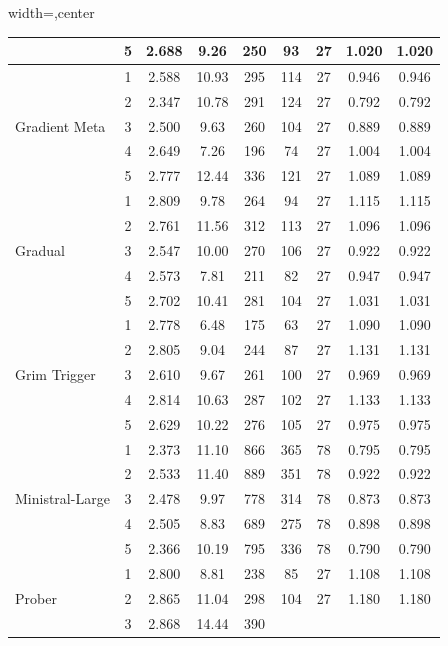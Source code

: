 \begin{table}[htbp]
\begin{adjustbox}{width=\textwidth,center}
\begin{tabular}{|l|c|c|c|c|c|c|c|c|}
 & 
5 & 
2.688 & 
9.26 & 
250 & 
93 & 
27 & 
1.020 & 
1.020 \\
\hline
\multirow{5}{*}{Gradient Meta} & 
1 & 
2.588 & 
10.93 & 
295 & 
114 & 
27 & 
0.946 & 
0.946 \\
 & 
2 & 
2.347 & 
10.78 & 
291 & 
124 & 
27 & 
0.792 & 
0.792 \\
 & 
3 & 
2.500 & 
9.63 & 
260 & 
104 & 
27 & 
0.889 & 
0.889 \\
 & 
4 & 
2.649 & 
7.26 & 
196 & 
74 & 
27 & 
1.004 & 
1.004 \\
 & 
5 & 
2.777 & 
12.44 & 
336 & 
121 & 
27 & 
1.089 & 
1.089 \\
\hline
\multirow{5}{*}{Gradual} & 
1 & 
2.809 & 
9.78 & 
264 & 
94 & 
27 & 
1.115 & 
1.115 \\
 & 
2 & 
2.761 & 
11.56 & 
312 & 
113 & 
27 & 
1.096 & 
1.096 \\
 & 
3 & 
2.547 & 
10.00 & 
270 & 
106 & 
27 & 
0.922 & 
0.922 \\
 & 
4 & 
2.573 & 
7.81 & 
211 & 
82 & 
27 & 
0.947 & 
0.947 \\
 & 
5 & 
2.702 & 
10.41 & 
281 & 
104 & 
27 & 
1.031 & 
1.031 \\
\hline
\multirow{5}{*}{Grim Trigger} & 
1 & 
2.778 & 
6.48 & 
175 & 
63 & 
27 & 
1.090 & 
1.090 \\
 & 
2 & 
2.805 & 
9.04 & 
244 & 
87 & 
27 & 
1.131 & 
1.131 \\
 & 
3 & 
2.610 & 
9.67 & 
261 & 
100 & 
27 & 
0.969 & 
0.969 \\
 & 
4 & 
2.814 & 
10.63 & 
287 & 
102 & 
27 & 
1.133 & 
1.133 \\
 & 
5 & 
2.629 & 
10.22 & 
276 & 
105 & 
27 & 
0.975 & 
0.975 \\
\hline
\multirow{5}{*}{Ministral-Large} & 
1 & 
2.373 & 
11.10 & 
866 & 
365 & 
78 & 
0.795 & 
0.795 \\
 & 
2 & 
2.533 & 
11.40 & 
889 & 
351 & 
78 & 
0.922 & 
0.922 \\
 & 
3 & 
2.478 & 
9.97 & 
778 & 
314 & 
78 & 
0.873 & 
0.873 \\
 & 
4 & 
2.505 & 
8.83 & 
689 & 
275 & 
78 & 
0.898 & 
0.898 \\
 & 
5 & 
2.366 & 
10.19 & 
795 & 
336 & 
78 & 
0.790 & 
0.790 \\
\hline
\multirow{5}{*}{Prober} & 
1 & 
2.800 & 
8.81 & 
238 & 
85 & 
27 & 
1.108 & 
1.108 \\
 & 
2 & 
2.865 & 
11.04 & 
298 & 
104 & 
27 & 
1.180 & 
1.180 \\
 & 
3 & 
2.868 & 
14.44 & 
390 & 

\end{tabular}
\end{adjustbox}
\end{table}
